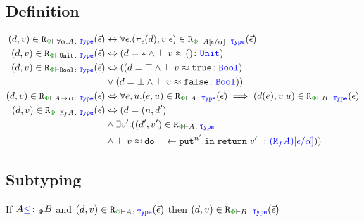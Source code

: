 \documentclass{Report}
\newcommand\erelates[2]{\texttt{R}_{\wellformedt{#1}{#2}}}
\newcommand{\av}[0]{\vec{\a}}
\newcommand\inLogRel[5]{(#1, #2)\in\erelates{#3}{#4}(#5)}
\newcommand\inLogRelE[4]{\inLogRel{#1}{#2}{#3}{#4}{\ev}}
\newcommand{\inLogRelPE}[3]{\inLogRelE{#1}{#2}{\P}{#3}}
\begin{document}
\subsection{Definition}
\begin{definition}

    \begin{align*}
        \label{LogicalRelationDefinition}
        (d, v)\in\erelates{\P}{\all{\a}{A}}(\ev) & \leftrightarrow \forall\e. (\pe(d), \eapp{v}{\e})\in\erelates{\P}{A\ssub{\a}{\e}}(\ev)\\
        (d, v)\in\erelates{\P}{\U}(\ev) & \Leftrightarrow (d=\singleton \wedge \zberelation{v}{()}{\U})
        \\
        (d, v)\in\erelates{\P}{\B}(\ev) & \Leftrightarrow ((d=\top \wedge \zberelation{v}{\t}{\B}) 
        \\& \vee (d=\bot \wedge \zberelation{v}{\f}{\B}))
        \\
        (d, v)\in\erelates{\P}{\ab}(\ev)  &\Leftrightarrow \forall e, u. (e, u)\in\erelates{\P}{A}(\ev) \implies (d(e), \apply{v}{u})\in \erelates{\P}{B}(\ev)
        \\
        (d, v)\in\erelates{\P}{\M{f}{A}}(\ev) &\Leftrightarrow (d= (n, d')
        \\ & \wedge \exists v'. ((d', v')\in\erelates{\P}{A}
        \\ & \wedge  \zberelation{v}{\doin{\_}{\put^{n'}}{\return{v'}}}{(\M{f}{A})\ssub{\av}{\ev}}))
    \end{align*}
\end{definition}
\subsection{Subtyping}

\begin{theorem}\label{LogRelSubtype}
    If $A{\color{blue} \leq\colon}_\Phi B$ and $\inLogRelPE{d}{v}{A}$ then $\inLogRelPE{d}{v}{B}$
\end{theorem}
\end{document}
